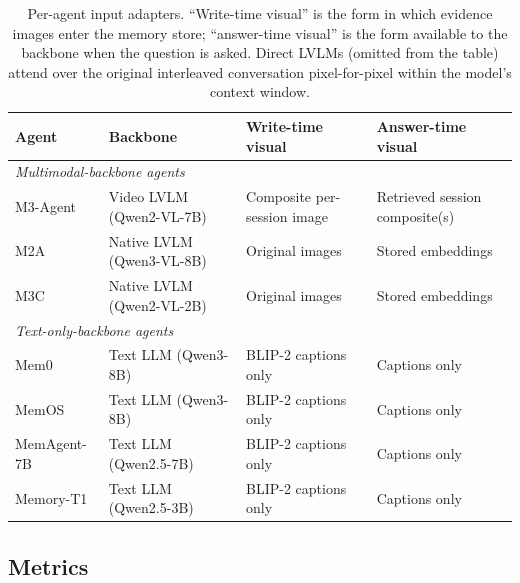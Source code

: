 \documentclass{article}
\begin{document}
\begin{table}[h]
\caption{Per-agent input adapters. ``Write-time visual'' is the form in which evidence images enter the memory store; ``answer-time visual'' is the form available to the backbone when the question is asked. Direct LVLMs (omitted from the table) attend over the original interleaved conversation pixel-for-pixel within the model's context window.}
\label{tab:agent_adapters}
\centering
\small
\begin{tabular}{llll}
\toprule
\textbf{Agent} & \textbf{Backbone} & \textbf{Write-time visual} & \textbf{Answer-time visual} \\
\midrule
\multicolumn{4}{l}{\textit{Multimodal-backbone agents}} \\
\midrule
M3-Agent      & Video LVLM (Qwen2-VL-7B)    & Composite per-session image       & Retrieved session composite(s) \\
M2A           & Native LVLM (Qwen3-VL-8B)   & Original images                   & Stored embeddings \\
M3C           & Native LVLM (Qwen2-VL-2B)   & Original images                   & Stored embeddings \\
\midrule
\multicolumn{4}{l}{\textit{Text-only-backbone agents}} \\
\midrule
Mem0          & Text LLM (Qwen3-8B)        & BLIP-2 captions only              & Captions only \\
MemOS         & Text LLM (Qwen3-8B)        & BLIP-2 captions only              & Captions only \\
MemAgent-7B   & Text LLM (Qwen2.5-7B)      & BLIP-2 captions only              & Captions only \\
Memory-T1     & Text LLM (Qwen2.5-3B)      & BLIP-2 captions only              & Captions only \\
\bottomrule
\end{tabular}
\end{table}

\subsection{Metrics}
\label{subsec:metrics}
\end{document}
